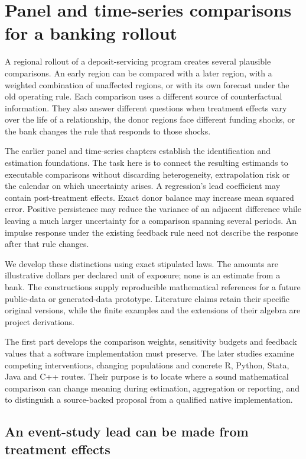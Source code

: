 \chapter{Panel and time-series comparisons for a banking rollout}
\label{exec17:s6}

A regional rollout of a deposit-servicing program creates several plausible
comparisons. An early region can be compared with a later region, with a
weighted combination of unaffected regions, or with its own forecast under the
old operating rule. Each comparison uses a different source of counterfactual
information. They also answer different questions when treatment effects
vary over the life of a relationship, the donor regions face different funding
shocks, or the bank changes the rule that responds to those shocks.

The earlier panel and time-series chapters establish the identification and
estimation foundations. The task here is to connect the resulting estimands
to executable comparisons without discarding heterogeneity, extrapolation risk
or the calendar on which uncertainty arises. A regression's lead coefficient
may contain post-treatment effects. Exact donor balance may increase mean
squared error. Positive persistence may reduce the variance of an adjacent
difference while leaving a much larger uncertainty for a comparison spanning
several periods. An impulse response under the existing feedback rule need
not describe the response after that rule changes.

We develop these distinctions using exact stipulated laws. The amounts are
illustrative dollars per declared unit of exposure; none is an estimate from
a bank. The constructions supply reproducible mathematical references for a
future public-data or generated-data prototype. Literature claims retain their
specific original versions, while the finite examples and the extensions of
their algebra are project derivations.~\citep{exec17_s6_math}

The first part develops the comparison weights, sensitivity budgets and
feedback values that a software implementation must preserve. The later
studies examine competing interventions, changing populations and concrete
R, Python, Stata, Java and C++ routes. Their purpose is to locate where a
sound mathematical comparison can change meaning during estimation,
aggregation or reporting, and to distinguish a source-backed proposal
from a qualified native implementation.

\section{An event-study lead can be made from treatment effects}
\label{exec17:s6-event}

